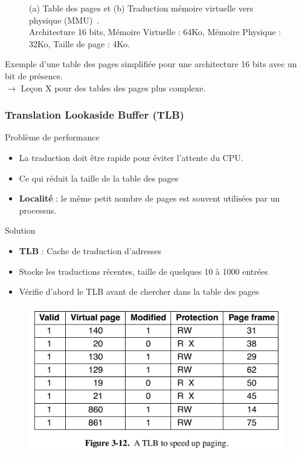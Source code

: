 \documentclass[8pt]{beamer}
\begin{document}
\begin{frame}
\begin{figure}
\begin{minipage}[b]{0.5\linewidth}
            \subcaption{}
            \label{fig:page_mapping}
        \end{minipage}
        \caption{(a) Table des pages et (b) Traduction mémoire
            virtuelle vers
            physique (MMU)~\cite{tanenbaum2009modern}.\\
            Architecture 16 bits,
            Mémoire Virtuelle : 64Ko, Mémoire Physique : 32Ko,
            Taille de page : 4Ko. \\
        }
    \end{figure}
    Exemple d'une table des pages simplifiée pour une architecture 16 bits avec
    un bit de
    pr\'esence.\\
    $\to$ Le\c{c}on X pour des tables des pages plus complexe.

\end{frame}

\begin{frame}
    \frametitle{Translation Lookaside Buffer (TLB)}

    \begin{alertblock}{Problème de performance}
        \begin{itemize}
            \item La traduction doit \^etre rapide pour \'eviter
                  l'attente du
                  CPU.
            \item Ce qui r\'eduit la taille de la table des pages
            \item \textbf{Localité} : le même petit nombre de pages est souvent
                  utilisées par un processus.
        \end{itemize}
    \end{alertblock}
    \begin{exampleblock}{Solution}
        \begin{itemize}
            \item \textbf{TLB} : Cache de traduction d'adresses
            \item Stocke les traductions récentes, taille de quelques 10 à 1000
                  entrées
            \item Vérifie d'abord le TLB avant de chercher dans la table des
                  pages
        \end{itemize}
    \end{exampleblock}
    \begin{figure}
        \centering
        \includegraphics[width=.35\textwidth]{figures/TLB.png}
    \end{figure}
\end{frame}
\end{document}
